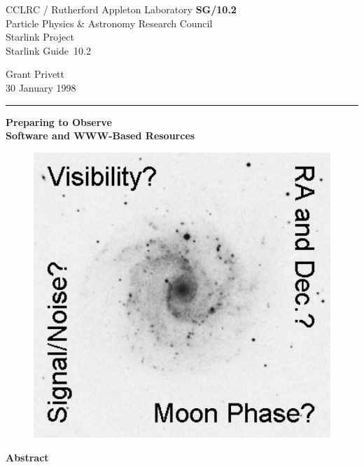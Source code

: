 \documentclass[twoside,11pt]{article}
\newcommand{\stardoccategory}  {Starlink Guide}
\newcommand{\stardocinitials}  {SG}
\newcommand{\stardocnumber}    {10.2}
\newcommand{\stardocauthors}   {Grant Privett}
\newcommand{\stardocdate}      {30 January 1998}
\newcommand{\stardoctitle}     {Preparing to Observe}
\newcommand{\stardocversion}   {Software and WWW-Based Resources}
\newcommand{\stardocname}{\stardocinitials /\stardocnumber}
\newenvironment{latexonly}{}{}
\begin{document}
\thispagestyle{empty}

\begin{latexonly}
   CCLRC / {\sc Rutherford Appleton Laboratory} \hfill {\bf \stardocname}\\
   {\large Particle Physics \& Astronomy Research Council}\\
   {\large Starlink Project\\}
   {\large \stardoccategory\ \stardocnumber}
   \begin{flushright}
   \stardocauthors\\
   \stardocdate
   \end{flushright}
   \vspace{-4mm}
   \rule{\textwidth}{0.5mm}
   \vspace{5mm}
   \begin{center}
   {\Huge\bf  \stardoctitle \\ [2.5ex]}
   {\LARGE\bf \stardocversion \\ [4ex]}
   \end{center}

   \vspace{10mm}
   \begin{center}
   \begin{figure}[h]
   \leavevmode
   \centering \includegraphics{sg10_front}
   \end{figure}
   \end{center}

   \begin{center}
      {\Large\bf Abstract}
   \end{center}

\end{latexonly}
\end{document}

